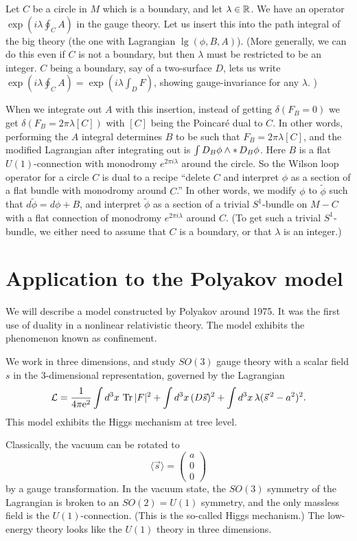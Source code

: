 Let $C$ be a circle in $M$ which is a boundary, and let $\lambda\in{\Bbb R}$.
We have an operator $\exp(i\lambda \oint _C A)$  in the gauge theory.
Let us insert this into the path integral of the big theory (the one with
Lagrangian $\lg(\phi,B,A)$).
(More generally, we can do this even if $C$ is not a boundary, but then
$\lambda$ must be restricted to be an integer.  $C$ being a boundary, say
of a two-surface $D$, lets us write $\exp(i\lambda \oint _C A)
= \exp(i\lambda\int_DF)$, showing gauge-invariance for any $\lambda$. )

When we integrate out $A$ with this insertion, instead of getting
$\delta(F_B=0)$
we get $\delta(F_B=2\pi\lambda[C])$ with $[C]$ being the Poincar\'e dual to
$C$.    In other words,
performing the $A$ integral determines $B$ to be such that
$F_B=2\pi\lambda[C]$,
and the modified Lagrangian after integrating out is $\int D_B\phi\wedge\mathop{*}
D_B\phi$.
Here $B$ is a
flat $U(1)$-connection with monodromy $e^{2\pi i \lambda}$ around the circle.
So the Wilson loop operator for a circle $C$ is dual to a recipe
``delete $C$ and interpret $\phi$ as a section of a flat bundle with
monodromy around $C$.''
In other words, we modify $\phi$ to $\widetilde{\phi}$ such that
$d\widetilde{\phi}=d\phi+B$, and interpret $\widetilde{\phi}$ as a section of
a trivial $S^1$-bundle on $M-C$ with a flat connection of monodromy
$e^{2\pi i\lambda}$
around $C$.  (To get such a trivial $S^1$-bundle, we either need to assume that
$C$ is a boundary, or that $\lambda$ is an integer.)

\section{Application to the Polyakov model}

We will describe a model constructed by Polyakov around 1975.  It was the first
use of duality in a nonlinear relativistic theory.  The model exhibits the
phenomenon known as confinement.

We work in three dimensions, and study $SO(3)$ gauge theory with a scalar
field $s$ in the $3$-dimensional representation, governed by the Lagrangian
\begin{equation}
{\cal L}=\frac1{4\pi \text{e}^2}\int d^3x\, \operatorname{\rm Tr}|F|^2 + \int d^3x\,(D\vec{s})^2
+\int d^3x\,\lambda(\vec{s}\,{}^2-a^2)^2.
\end{equation}
This model exhibits the Higgs mechanism at tree level.

Classically, the vacuum can be rotated to
\begin{equation}
\langle\vec{s}\rangle=\begin{pmatrix}a\\0\\0\end{pmatrix}
\end{equation}
by a gauge transformation.  In the vacuum state, the $SO(3)$ symmetry of
the Lagrangian is broken to an $SO(2)=U(1)$ symmetry, and the only massless
field is the $U(1)$-connection.  (This is the so-called Higgs mechanism.)
The low-energy theory looks like the $U(1)$ theory in three dimensions.

